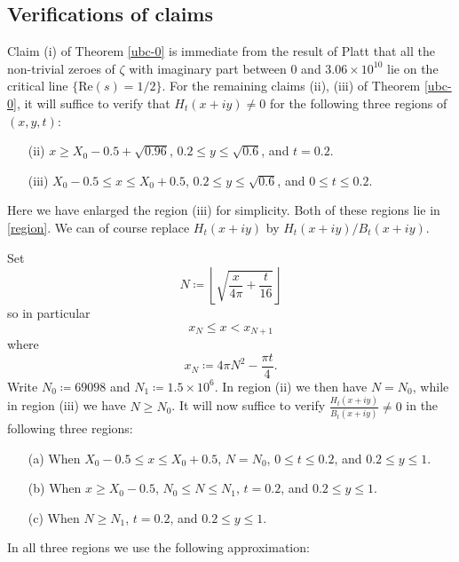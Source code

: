\subsection{Verifications of claims}

Claim (i) of Theorem \ref{ubc-0} is immediate from the result of Platt \cite{platt} that all the non-trivial zeroes of $\zeta$ with imaginary part between $0$ and $3.06 \times 10^{10}$ lie on the critical line $\{ \mathrm{Re}(s) = 1/2\}$.  For the remaining claims (ii), (iii) of Theorem \ref{ubc-0}, it will suffice to verify that $H_t(x+iy) \neq 0$ for the following three regions of $(x,y,t)$:
\begin{itemize}
\item[(ii)]  $x \geq X_0 - 0.5 + \sqrt{0.96}$, $0.2 \leq y \leq \sqrt{0.6}$, and $t = 0.2$. 
\item[(iii)]  $X_0 - 0.5 \leq x \leq X_0 + 0.5$, $0.2 \leq y \leq \sqrt{0.6}$, and $0 \leq t \leq 0.2$.
\end{itemize}
Here we have enlarged the region (iii) for simplicity.  Both of these regions lie in \eqref{region}.  We can of course replace $H_t(x+iy)$ by $H_t(x+iy)/B_t(x+iy)$.  

Set
$$ N \coloneqq \left\lfloor \sqrt{\frac{x}{4\pi} + \frac{t}{16}} \right\rfloor $$ %
so in particular
\begin{equation}\label{xnn}
 x_N \leq x < x_{N+1}
\end{equation}
where
$$ x_N \coloneqq 4 \pi N^2 - \frac{\pi t}{4}.$$
Write $N_0 \coloneqq 69098$ and $N_1 \coloneqq 1.5 \times 10^6$.
In region (ii) we then have $N = N_0$, while in region (iii) we have $N \geq N_0$.  It will now suffice to verify $\frac{H_t(x+iy)}{B_t(x+iy)} \neq 0$ in the following three regions:
\begin{itemize}
\item[(a)]  When $X_0 - 0.5 \leq x \leq X_0 + 0.5$, $N = N_0$, $0 \leq t \leq 0.2$, and $0.2 \leq y \leq 1$.
\item[(b)]  When $x \geq X_0 - 0.5$, $N_0 \leq N \leq N_1$, $t = 0.2$, and $0.2 \leq y \leq 1$.
\item[(c)]  When $N \geq N_1$, $t = 0.2$, and $0.2 \leq y \leq 1$.
\end{itemize}

In all three regions we use the following approximation:

